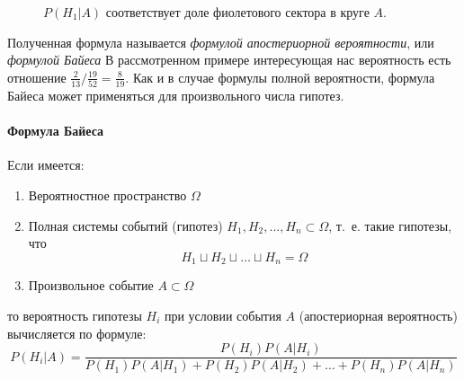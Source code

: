 \documentclass[11pt]{article}
\begin{document}
\begin{figure}[hbt]
{
	}
    \caption{$P(H_1 \vert A)$ соответствует доле фиолетового сектора в круге $A$.}
    \label{fig:bayes}
\end{figure}
Полученная формула называется \emph{формулой апостериорной вероятности}, или
\emph{формулой Байеса} В рассмотренном примере интересующая нас вероятность есть
отношение $\frac{2}{13} / \frac{19}{52} = \frac{8}{19}$. Как и в случае формулы полной вероятности,
формула Байеса может применяться для произвольного числа гипотез.

\paragraph{Формула Байеса} Если имеется:
\begin{enumerate}
    \item Вероятностное пространство $\Omega$
    \item Полная системы событий (гипотез) $H_1, H_2,..., H_n \subset \Omega$,
    т.~е. такие гипотезы, что $$H_1 \sqcup H_2 \sqcup \dots \sqcup H_n = \Omega$$
    \item Произвольное событие $A \subset \Omega$
\end{enumerate}
то вероятность гипотезы $H_i$ при условии события $A$ (апостериорная вероятность)
вычисляется по формуле:
$$
    P(H_i \vert A)
    = \frac{P(H_i)P(A \vert H_i)}
    {P(H_1)P(A \vert H_1)+P(H_2)P(A \vert H_2)+\dots+P(H_n)P(A \vert H_n)}
$$
\end{document}
